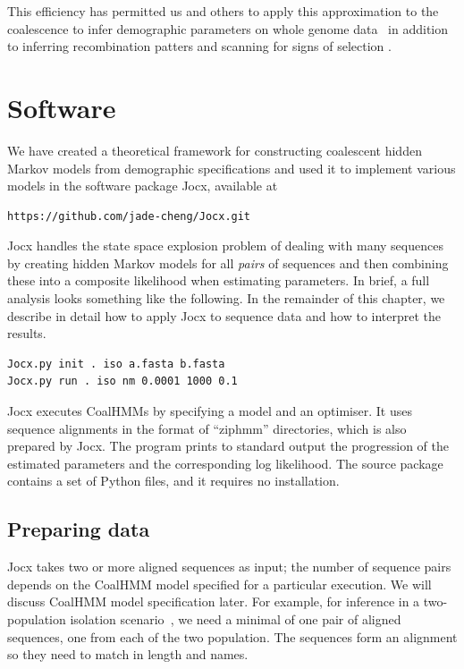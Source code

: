 \documentclass[graybox]{svmult}
\begin{document}
This efficiency has permitted us and others to apply this approximation to the coalescence to infer demographic parameters on whole genome data~\cite{Li:2011eza,Locke:2011gna, Hobolth:2011dia, Scally:2012ika, Prufer:2012ea, Miller:2012cxa, Abascal:2016cy, PradoMartinez:2013dna, Jonsson:2014fga} in addition to inferring recombination patters \cite{Munch:2014cba,Munch:2014cwa} and scanning for signs of selection \cite{Dutheil:2015kl,Munch:2016dn}.

\section{Software}

We have created a theoretical framework for constructing coalescent hidden Markov models from demographic specifications \cite{Mailund:2011dva,Mailund:2012ewa,Mailund2012,Cheng:2015kia} and used it to implement various models in the software package Jocx, available at

 {\scriptsize{}\begin{verbatim}
https://github.com/jade-cheng/Jocx.git
\end{verbatim}}

Jocx handles the state space explosion problem of dealing with many sequences by creating hidden Markov models for all \emph{pairs} of sequences and then combining these into a composite likelihood when estimating parameters. In brief, a full analysis looks something like the following.  In the remainder of this chapter, we describe in detail how to apply Jocx to sequence data and how to interpret the results.

 {\scriptsize{}\begin{verbatim}
Jocx.py init . iso a.fasta b.fasta
Jocx.py run . iso nm 0.0001 1000 0.1
\end{verbatim}}

Jocx executes CoalHMMs by specifying a model and an optimiser. It uses sequence alignments in the format of ``ziphmm'' directories, which is also prepared by Jocx. The program prints to standard output the progression of the estimated parameters and the corresponding log likelihood. The source package contains a set of Python files, and it requires no installation.


\subsection{Preparing data}

Jocx takes two or more aligned sequences as input; the number of sequence pairs depends on the CoalHMM model specified for a particular execution. We will discuss CoalHMM model specification later. For example, for inference in a two-population isolation scenario~\cite{Mailund:2011dva}, we need a minimal of one pair of aligned sequences, one from each of the two population. The sequences form an alignment so they need to match in length and names.
\end{document}
